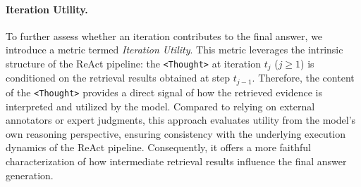 \paragraph{Iteration Utility.} To further assess whether an iteration contributes to the final answer, we introduce a metric termed \textit{Iteration Utility}. This metric leverages the intrinsic structure of the ReAct pipeline: 
the \texttt{<Thought>} at iteration $t_j$ ($j \geq 1$) is conditioned on the retrieval results obtained at step $t_{j-1}$. Therefore, the content of the \texttt{<Thought>} provides a direct signal of how the retrieved evidence is interpreted and utilized by the model. Compared to relying on external annotators or expert judgments, this approach evaluates utility from the model’s own reasoning perspective, ensuring consistency with the underlying execution dynamics of the ReAct pipeline. 
Consequently, it offers a more faithful characterization of how intermediate retrieval results influence the final answer generation.

